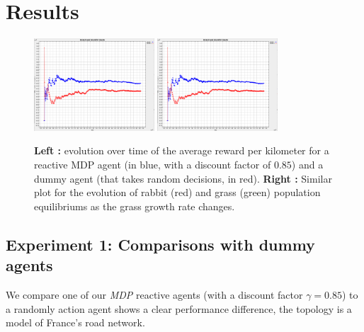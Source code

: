 \documentclass[11pt]{article}
\begin{document}
\section{Results}


\begin{figure}[h!]
	\centering
	\includegraphics[width=0.4\textwidth]{figures/random_vs_mdp.png}
	\includegraphics[width=0.4\textwidth]{figures/random_vs_mdp.png}
	\caption{\textbf{Left :} evolution over time of the average reward per kilometer for a reactive MDP agent (in blue, with a discount factor of $0.85$) and a dummy agent (that takes random decisions, in red). \textbf{Right :} Similar plot for the evolution of rabbit (red) and grass (green) population equilibriums as the grass growth rate changes.}
\end{figure}

\subsection{Experiment 1: Comparisons with dummy agents}
We compare one of our \emph{MDP} reactive agents (with a discount factor $\gamma = 0.85$) to a randomly action agent shows a clear performance difference, the topology is a model of France's road network.
\end{document}
